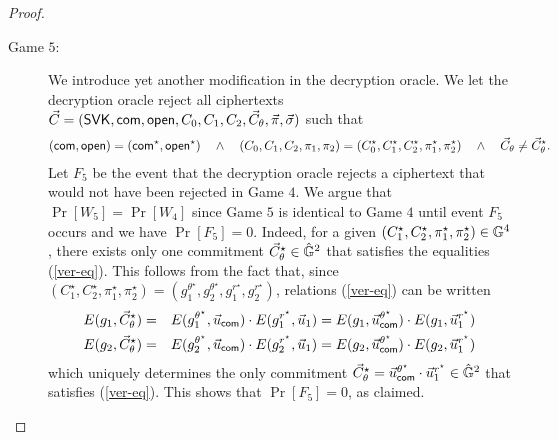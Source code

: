 \begin{proof}
\begin{description}
  \item[\textsf{Game} $5$:] We introduce yet another modification in the decryption oracle.  We let the decryption oracle reject all ciphertexts $ \vec{C} = (\mathsf{SVK}, \mathsf{com}, \mathsf{open}, C_0, C_1, C_2, \vec{C}_{\theta}, \vec{\pi}, \vec{\sigma})  $ 
    such that
    \begin{eqnarray} \label{event-F5}
      (\mathsf{com},\mathsf{open})=(\mathsf{com}^\star,\mathsf{open}^\star)  \quad \wedge \quad (C_0,C_1,C_2,\pi_1,\pi_2) = (C_0^\star,C_1^\star,C_2^\star,\pi_1^\star,\pi_2^\star) 
      \quad \wedge \quad \vec{C}_{\theta} \neq \vec{C}_{\theta}^\star .
    \end{eqnarray}  
    Let $F_5$ be the event that the decryption oracle rejects a ciphertext that would not have been rejected in Game $4$.   
    We argue that $\Pr[W_5] = \Pr[W_4]$ since Game $5$ is identical to Game $4$ until event $F_5$ occurs and we have $\Pr[F_5]=0$. 
    Indeed, 
    for a given $(C_1^\star,C_2^\star,\pi_1^\star,\pi_2^\star) \in \mathbb{G}^4$, there exists only one commitment $\vec{C}_{\theta}^\star \in \hat{\mathbb{G}}^2$ that satisfies the equalities (\ref{ver-eq}). This follows from the fact that, since  
    $(C_1^\star,C_2^\star,\pi_1^\star,\pi_2^\star)=(g_1^{\theta^\star},g_2^{\theta^\star},g_1^{r^\star},g_2^{r^\star})$, relations 
    (\ref{ver-eq}) can be written
    \begin{eqnarray*}  
      E(g_1,\vec{C}_{\theta}^\star) &=& E(g_1^{\theta^\star} , \vec{u}_{\mathsf{com}}) \cdot E(g_1^{r^\star},\vec{u}_1) = E(g_1 , \vec{u}_{\mathsf{com}}^{\theta^\star}) \cdot E(g_1,\vec{u}_1^{r^\star}) \\ \nonumber
      E(g_2,\vec{C}_{\theta}^\star) &=& E(g_2^{\theta^\star} , \vec{u}_{\mathsf{com}}) \cdot E(g_2^{r^\star},\vec{u}_1) =E(g_2 , \vec{u}_{\mathsf{com}}^{\theta^\star}) \cdot E(g_2,\vec{u}_1^{r^\star})
    \end{eqnarray*}
    which uniquely determines the  only commitment $\vec{C}_{\theta}^\star=\vec{u}_{\mathsf{com}}^{\theta^\star} \cdot \vec{u}_1^{r^\star} \in \hat{\mathbb{G}}^2$ that satisfies (\ref{ver-eq}). 
    This shows that $\Pr[F_5] = 0$, as claimed. 
    \smallskip \smallskip 






\end{description}
\end{proof}
